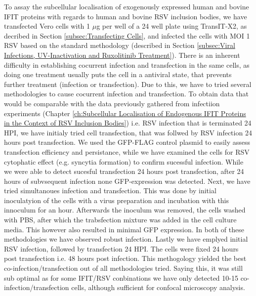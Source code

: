 To assay the subcellular localisation of exogenously expressed human and bovine IFIT proteins with regards to human and bovine RSV inclusion bodies, we have transfected Vero cells with 1 \(\mu\)g per well of a 24 well plate using TransIT-X2, as decribed in Section \ref{subsec:Transfecting Cells}, and infected the cells with MOI 1 RSV based on the standard methodology (described in Section \ref{subsec:Viral Infections, UV-Inactivation and Ruxolitinib Treatment}). There is an inherent difficulty in establishing cocurrent infection and transfection in the same cells, as doing one treatment usually puts the cell in a antiviral state, that prevents further treatment (infection or transfection). Due to this, we have to tried several methodologies to cause cocurrent infection and transfection. To obtain data that would be comparable with the data previously gathered from infectiion experiments (Chapter \ref{ch:Subcellular Localisation of Endogenous IFIT Proteins in the Context of RSV Inclusion Bodies}) i.e. RSV infection that is terminated 24 HPI, we have initialy tried cell transfection, that was follwed by RSV infection 24 hours post transfection. We used the GFP-FLAG control plasmid to easily assess transfection efficiency and persistance, while we have examined the cells for RSV cytophatic effect (e.g. syncytia formation) to confirm sucessful infection. While we were able to detect sucesful transfection 24 hours post transfection, after 24 hours of subvsequent infection none GFP-expression was detected. Next, we have tried simultanoues infection and transfection. This was done by initial inoculatyion of the cells with a virus preparation and incubation with this innoculum for an hour. Afterwards the inoculum was removed, the cells washed with PBS, after which the trabsfection mixture was added in the cell culture media. This however also resulted in minimal GFP expression. In both of these methodologies we have observed robust infection. Lastly we have emplyed initial RSV infection, followed by transfection 24 HPI. The cells were fixed 24 hours post transfection i.e. 48 hours post infection. This methogology yielded the best co-infection/transfection out of all methodologies tried. Saying this, it was still sub optimal as for some IFIT/RSV conbinations we have only detected 10-15 co-infection/transfection cells, although sufficient for confocal microscopy analysis.

